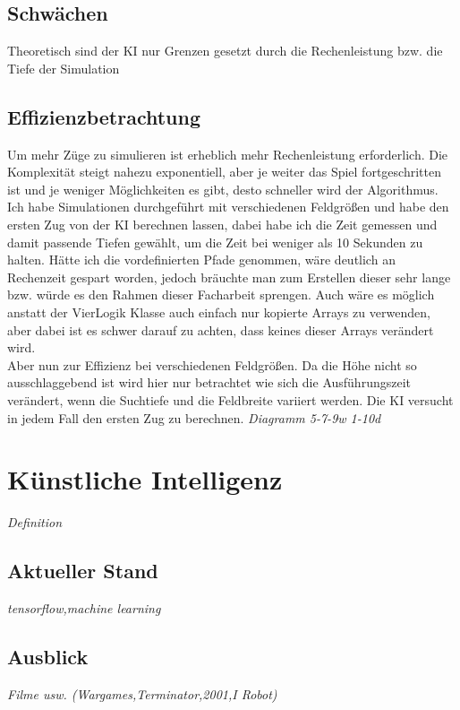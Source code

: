 \documentclass[12pt,a4paper,ngerman]{article}
\begin{document}
	\subsection{Schwächen}
	Theoretisch sind der KI nur Grenzen gesetzt durch die Rechenleistung bzw. die Tiefe der Simulation
	\subsection{Effizienzbetrachtung}
	Um mehr Züge zu simulieren ist erheblich mehr Rechenleistung erforderlich. Die Komplexität steigt nahezu exponentiell, aber je weiter das Spiel fortgeschritten ist und je weniger Möglichkeiten es gibt, desto schneller wird der Algorithmus. Ich habe Simulationen durchgeführt mit verschiedenen Feldgrößen und habe den ersten Zug von der KI berechnen lassen, dabei habe ich die Zeit gemessen und damit passende Tiefen gewählt, um die Zeit bei weniger als 10 Sekunden zu halten. Hätte ich die vordefinierten Pfade genommen, wäre deutlich an Rechenzeit gespart worden, jedoch bräuchte man zum Erstellen dieser sehr lange bzw. würde es den Rahmen dieser Facharbeit sprengen. Auch wäre es möglich anstatt der VierLogik Klasse auch einfach nur kopierte Arrays zu verwenden, aber dabei ist es schwer darauf zu achten, dass keines dieser Arrays verändert wird.\\
	Aber nun zur Effizienz bei verschiedenen Feldgrößen. Da die Höhe nicht so ausschlaggebend ist wird hier nur betrachtet wie sich die Ausführungszeit verändert, wenn die Suchtiefe und die Feldbreite variiert werden. Die KI versucht in jedem Fall den ersten Zug zu berechnen.
	\textit{Diagramm 5-7-9w 1-10d}
	\section{Künstliche Intelligenz}
	\textit{Definition}
	\subsection{Aktueller Stand}
	\textit{tensorflow,machine learning}
	\subsection{Ausblick}
	\textit{Filme usw. (Wargames,Terminator,2001,I Robot)}
	
\end{document}

